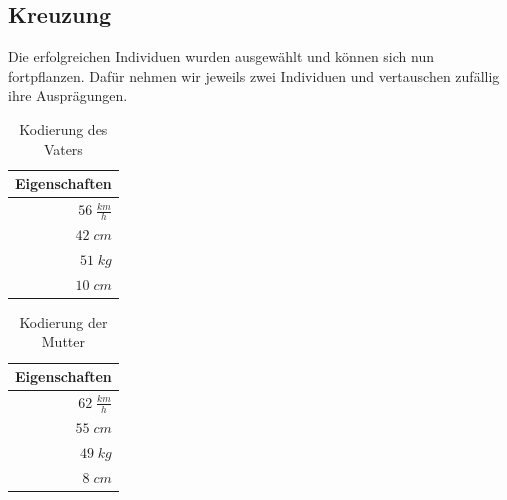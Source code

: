         \subsection{Kreuzung}
            Die erfolgreichen Individuen wurden ausgewählt und können sich nun fortpflanzen. Dafür nehmen wir jeweils zwei Individuen und vertauschen zufällig ihre Ausprägungen.
            \\[8mm]
            \begin{multicols}{2}
                \begin{table}[H]
                    \begin{center}
                    \begin{tabular}{ |r| } 
                        \hline
                        \hfill Eigenschaften  \\ \hline
                        \cellcolor{blue!25} $ 56\; \frac{km}{h}$ \\ \hline
                        \cellcolor{blue!25} $ 42\; cm          $ \\ \hline
                        \cellcolor{blue!25} $ 51\; kg          $ \\ \hline
                        \cellcolor{blue!25} $ 10\; cm          $ \\ \hline
                    \end{tabular}
                    \end{center}
                    \caption{Kodierung des Vaters \label{fig:enc-dad}}
                \end{table}

                \begin{table}[H]
                    \begin{center}
                    \begin{tabular}{ |r| } 
                        \hline
                        \hfill Eigenschaften  \\ \hline
                        \cellcolor{yellow!25} $ 62\; \frac{km}{h}$ \\ \hline
                        \cellcolor{yellow!25} $ 55\; cm          $ \\ \hline
                        \cellcolor{yellow!25} $ 49\; kg          $ \\ \hline
                        \cellcolor{yellow!25} $  8\; cm          $ \\ \hline
                    \end{tabular}
                    \end{center}
                    \caption{Kodierung der Mutter \label{fig:enc-mom}}
                \end{table}

            \end{multicols}

